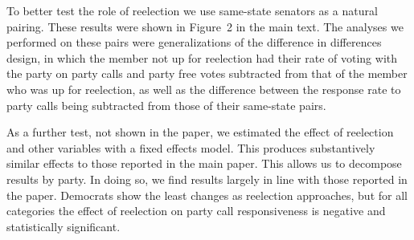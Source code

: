 \documentclass[12pt]{article}
\begin{document}
To better test the role of reelection we use same-state senators as a natural pairing. These results were shown in Figure~2 in the main text. The analyses we performed on these pairs were generalizations of the difference in differences design, in which the member not up for reelection had their rate of voting with the party on party calls and party free votes subtracted from that of the member who was up for reelection, as well as the difference between the response rate to party calls being subtracted from those of their same-state pairs.

As a further test, not shown in the paper, we estimated the effect of reelection and other variables with a fixed effects model. This produces substantively similar effects to those reported in the main paper. This allows us to decompose results by party. In doing so, we find results largely in line with those reported in the paper. Democrats show the least changes as reelection approaches, but for all categories the effect of reelection on party call responsiveness is negative and statistically significant.
\end{document}
